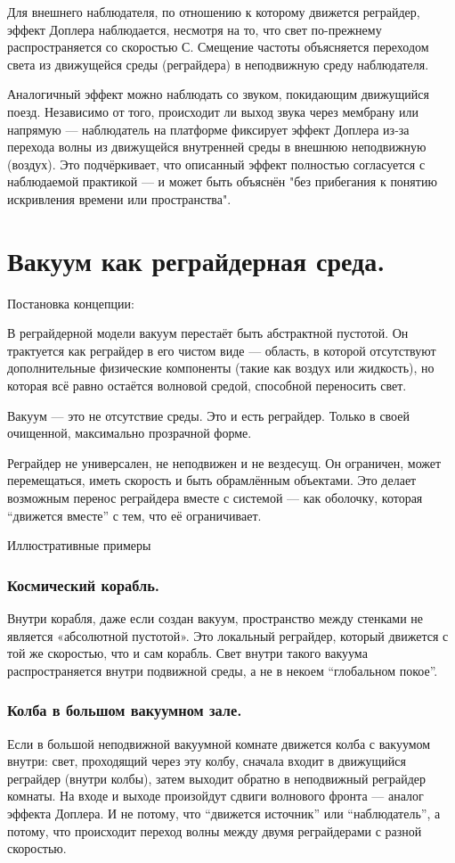 \documentclass[12pt]{article}
\begin{document}
Для внешнего наблюдателя, по отношению к которому движется реграйдер, эффект Доплера наблюдается, несмотря на то, что свет по-прежнему распространяется со скоростью С. Смещение частоты объясняется переходом света из движущейся среды (реграйдера) в неподвижную среду наблюдателя.

Аналогичный эффект можно наблюдать со звуком, покидающим движущийся поезд. Независимо от того, происходит ли выход звука через мембрану или напрямую — наблюдатель на платформе фиксирует эффект Доплера из-за перехода волны из движущейся внутренней среды в внешнюю неподвижную (воздух). Это подчёркивает, что описанный эффект полностью согласуется с наблюдаемой практикой — и может быть объяснён "без прибегания к понятию искривления времени или пространства".

\section*{Вакуум как реграйдерная среда.}

Постановка концепции:

В реграйдерной модели вакуум перестаёт быть абстрактной пустотой. Он трактуется как реграйдер в его чистом виде — область, в которой отсутствуют дополнительные физические компоненты (такие как воздух или жидкость), но которая всё равно остаётся волновой средой, способной переносить свет.

Вакуум — это не отсутствие среды. Это и есть реграйдер. Только в своей очищенной, максимально прозрачной форме.

Реграйдер не универсален, не неподвижен и не вездесущ. Он ограничен, может перемещаться, иметь скорость и быть обрамлённым объектами. Это делает возможным перенос реграйдера вместе с системой — как оболочку, которая “движется вместе” с тем, что её ограничивает.

Иллюстративные примеры

\subsubsection*{Космический корабль.}
Внутри корабля, даже если создан вакуум, пространство между стенками не является «абсолютной пустотой». Это локальный реграйдер, который движется с той же скоростью, что и сам корабль. Свет внутри такого вакуума распространяется внутри подвижной среды, а не в некоем “глобальном покое”.

\subsubsection*{Колба в большом вакуумном зале.}
Если в большой неподвижной вакуумной комнате движется колба с вакуумом внутри:
свет, проходящий через эту колбу, сначала входит в движущийся реграйдер (внутри колбы),
затем выходит обратно в неподвижный реграйдер комнаты.
На входе и выходе произойдут сдвиги волнового фронта — аналог эффекта Доплера. И не потому, что “движется источник” или “наблюдатель”, а потому, что происходит переход волны между двумя реграйдерами с разной скоростью.
\end{document}
